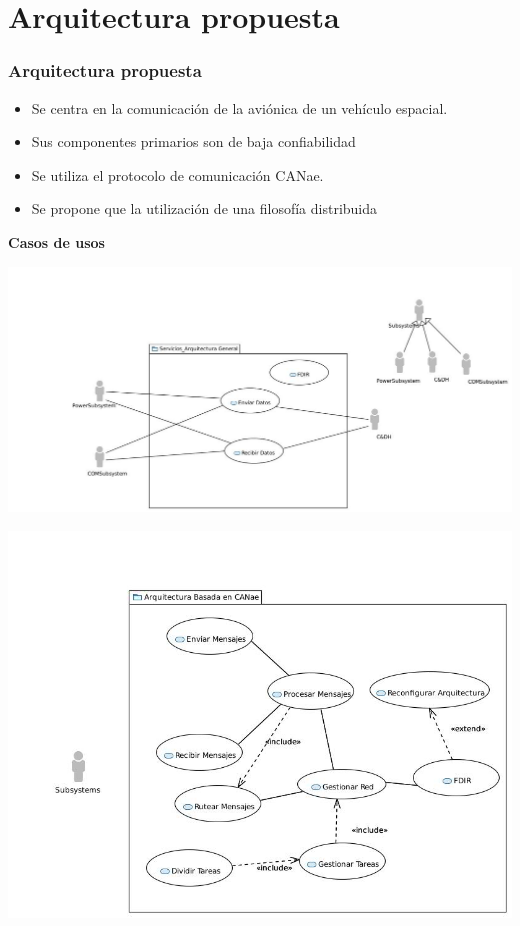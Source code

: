 \section{Arquitectura propuesta}
\begin{frame}
   \frametitle{Arquitectura propuesta}
   \begin{itemize}
   	\item Se centra en la comunicación de la aviónica de un vehículo espacial. 
   	\item Sus componentes primarios son de baja confiabilidad
   	\item Se utiliza el protocolo de comunicación CANae.
   	\item Se propone que la utilización de una filosofía distribuida
   \end{itemize}
\end{frame}

\begin{frame}[c]
		\centering
		\LARGE \textbf{Casos de usos}
\end{frame}

\begin{frame}
	\includegraphics[scale=0.28]{images/Arq_General.JPG}
\end{frame}

\begin{frame}[c]
	\centering
	\includegraphics[scale=0.4]{images/Caso_de_Uso_Arquitectura.JPG}
\end{frame}
 
